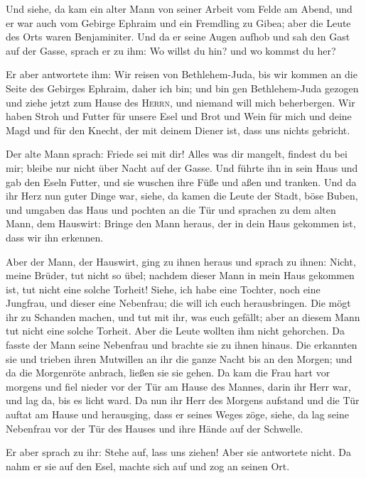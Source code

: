  Und siehe, da kam ein alter Mann von seiner Arbeit vom
Felde am Abend, und er war auch vom Gebirge Ephraim und ein Fremdling zu
Gibea; aber die Leute des Orts waren Benjaminiter.  Und
da er seine Augen aufhob und sah den Gast auf der Gasse, sprach er zu
ihm: Wo willst du hin? und wo kommst du her?

 Er aber antwortete ihm: Wir reisen von Bethlehem-Juda,
bis wir kommen an die Seite des Gebirges Ephraim, daher ich bin; und bin
gen Bethlehem-Juda gezogen und ziehe jetzt zum Hause des \textsc{Herrn},
und niemand will mich beherbergen.  Wir haben Stroh und
Futter für unsere Esel und Brot und Wein für mich und deine Magd und für
den Knecht, der mit deinem Diener ist, dass uns nichts gebricht.

 Der alte Mann sprach: Friede sei mit dir! Alles was dir
mangelt, findest du bei mir; bleibe nur nicht über Nacht auf der Gasse.
 Und führte ihn in sein Haus und gab den Eseln Futter,
und sie wuschen ihre Füße und aßen und tranken.  Und da
ihr Herz nun guter Dinge war, siehe, da kamen die Leute der Stadt, böse
Buben, und umgaben das Haus und pochten an die Tür und sprachen zu dem
alten Mann, dem Hauswirt: Bringe den Mann heraus, der in dein Haus
gekommen ist, dass wir ihn erkennen.

 Aber der Mann, der Hauswirt, ging zu ihnen heraus und
sprach zu ihnen: Nicht, meine Brüder, tut nicht so übel; nachdem dieser
Mann in mein Haus gekommen ist, tut nicht eine solche Torheit!
 Siehe, ich habe eine Tochter, noch eine Jungfrau, und
dieser eine Nebenfrau; die will ich euch herausbringen. Die mögt ihr zu
Schanden machen, und tut mit ihr, was euch gefällt; aber an diesem Mann
tut nicht eine solche Torheit.  Aber die Leute wollten
ihm nicht gehorchen. Da fasste der Mann seine Nebenfrau und brachte sie
zu ihnen hinaus. Die erkannten sie und trieben ihren Mutwillen an ihr
die ganze Nacht bis an den Morgen; und da die Morgenröte anbrach, ließen
sie sie gehen.  Da kam die Frau hart vor morgens und fiel
nieder vor der Tür am Hause des Mannes, darin ihr Herr war, und lag da,
bis es licht ward.  Da nun ihr Herr des Morgens aufstand
und die Tür auftat am Hause und herausging, dass er seines Weges zöge,
siehe, da lag seine Nebenfrau vor der Tür des Hauses und ihre Hände auf
der Schwelle.

 Er aber sprach zu ihr: Stehe auf, lass uns ziehen! Aber
sie antwortete nicht. Da nahm er sie auf den Esel, machte sich auf und
zog an seinen Ort.

